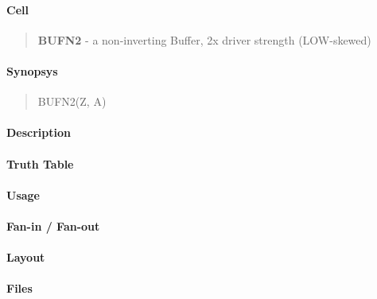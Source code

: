 \label{BUFN2}
\paragraph{Cell}
\begin{quote}
    \textbf{BUFN2} - a non-inverting Buffer, 2x driver strength (LOW-skewed)
\end{quote}

\paragraph{Synopsys}
\begin{quote}
    BUFN2(Z, A)
\end{quote}

\paragraph{Description}



\paragraph{Truth Table}
%

\paragraph{Usage}

\paragraph{Fan-in / Fan-out}

\paragraph{Layout}

\paragraph{Files}
